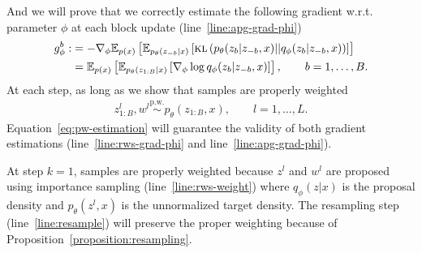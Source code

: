\documentclass[anonymous=false, %
               format=acmsmall, %
               review=true, %
               screen=true, %
               nonacm=true]{acmart}
\theoremstyle{definition}
\newcommand{\given}{\lvert}
\newcommand{\pw}{\overset{\text{p.w.}}{\sim}
}
\begin{document}
And we will prove that we correctly estimate the following gradient w.r.t. parameter $\phi$ at each block update (line~\ref{line:apg-grad-phi}) 
\begin{align}
    g_\phi^b 
    :&= - \nabla_\phi \E_{p(x)}\left[ \E_{p_\theta(z_{-b} \given x)}\left[\textsc{kl}\left(p_\theta(z_b \given z_{-b}, x) || q_\phi(z_b \given z_{-b}, x)\right)\right]
    \right]
    \\
    &= 
    \E_{p(x)}\left[
    \E_{p_\theta(z_{1:B} \given x)}\left[\nabla_\phi \log q_\phi(z_b \given z_{-b}, x)\right]
    \right], \qquad b = 1, \ldots, B
    . \label{eq:g-phi-b}
\end{align}
At each step, as long as we show that samples are properly weighted
\begin{align}
    z_{1:B}^l, w^l \pw p_\theta(z_{1:B}, x), \qquad l = 1, \ldots, L.
    \label{eq:invariant}
\end{align}
Equation~\ref{eq:pw-estimation} will guarantee the validity of both gradient estimations (line~\ref{line:rws-grad-phi} and line~\ref{line:apg-grad-phi}).

At step $k=1$, samples are properly weighted because $z^l$ and $w^l$ are proposed using importance sampling (line~\ref{line:rws-weight}) where $q_\phi(z \given x)$ is the proposal density and $p_\theta(z^l, x)$ is the unnormalized target density. The resampling step (line~\ref{line:resample}) will preserve the proper weighting because of  Proposition~\ref{proposition:resampling}.
\end{document}
